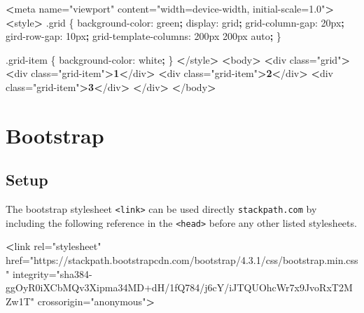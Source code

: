 \documentclass[]{book}
\newenvironment{Shaded}{\begin{snugshade}}{\end{snugshade}}
\newcommand{\KeywordTok}[1]{\textcolor[rgb]{0.13,0.29,0.53}{\textbf{#1}}}
\newcommand{\StringTok}[1]{\textcolor[rgb]{0.31,0.60,0.02}{#1}}
\newcommand{\FunctionTok}[1]{\textcolor[rgb]{0.00,0.00,0.00}{#1}}
\newcommand{\OperatorTok}[1]{\textcolor[rgb]{0.81,0.36,0.00}{\textbf{#1}}}
\newcommand{\ExtensionTok}[1]{#1}
\newcommand{\NormalTok}[1]{#1}
\begin{document}
\begin{Shaded}
\begin{Highlighting}[]
\OperatorTok{<}\ExtensionTok{meta}\NormalTok{ name=}\StringTok{"viewport"}\NormalTok{ content=}\StringTok{"width=device-width, initial-scale=1.0"}\OperatorTok{>}
\OperatorTok{<}\ExtensionTok{style}\OperatorTok{>}
    \ExtensionTok{.grid}\NormalTok{ \{}
        \ExtensionTok{background-color}\NormalTok{: green}\KeywordTok{;}
        \ExtensionTok{display}\NormalTok{: grid}\KeywordTok{;}
        \ExtensionTok{grid-column-gap}\NormalTok{: 20px}\KeywordTok{;}
        \ExtensionTok{gird-row-gap}\NormalTok{: 10px}\KeywordTok{;}
        \ExtensionTok{grid-template-columns}\NormalTok{: 200px 200px auto}\KeywordTok{;}
\NormalTok{    \}}

    \ExtensionTok{.grid-item}\NormalTok{ \{}
        \ExtensionTok{background-color}\NormalTok{: white}\KeywordTok{;}
\NormalTok{    \}}
\OperatorTok{<}\NormalTok{/}\ExtensionTok{style}\OperatorTok{>}
\OperatorTok{<}\ExtensionTok{body}\OperatorTok{>}
    \OperatorTok{<}\ExtensionTok{div}\NormalTok{ class=}\StringTok{"grid"}\OperatorTok{>}
        \OperatorTok{<}\ExtensionTok{div}\NormalTok{ class=}\StringTok{"grid-item"}\OperatorTok{>1<}\NormalTok{/div}\OperatorTok{>}
        \OperatorTok{<}\ExtensionTok{div}\NormalTok{ class=}\StringTok{"grid-item"}\OperatorTok{>2<}\NormalTok{/div}\OperatorTok{>}
        \OperatorTok{<}\ExtensionTok{div}\NormalTok{ class=}\StringTok{"grid-item"}\OperatorTok{>3<}\NormalTok{/div}\OperatorTok{>}
    \OperatorTok{<}\NormalTok{/}\ExtensionTok{div}\OperatorTok{>}
\OperatorTok{<}\NormalTok{/}\ExtensionTok{body}\OperatorTok{>}
\end{Highlighting}
\end{Shaded}

\chapter{Bootstrap}\label{bootstrap}

\section{Setup}\label{setup}

The bootstrap stylesheet \texttt{\textless{}link\textgreater{}} can be
used directly \texttt{stackpath.com} by including the following
reference in the \texttt{\textless{}head\textgreater{}} before any other
listed stylesheets.

\begin{Shaded}
\begin{Highlighting}[]
\OperatorTok{<}\FunctionTok{link}\NormalTok{ rel=}\StringTok{"stylesheet"}\NormalTok{ href=}\StringTok{"https://stackpath.bootstrapcdn.com/bootstrap/4.3.1/css/bootstrap.min.css"}\NormalTok{ integrity=}\StringTok{"sha384-ggOyR0iXCbMQv3Xipma34MD+dH/1fQ784/j6cY/iJTQUOhcWr7x9JvoRxT2MZw1T"}\NormalTok{ crossorigin=}\StringTok{"anonymous"}\OperatorTok{>}
\end{Highlighting}
\end{Shaded}
\end{document}
